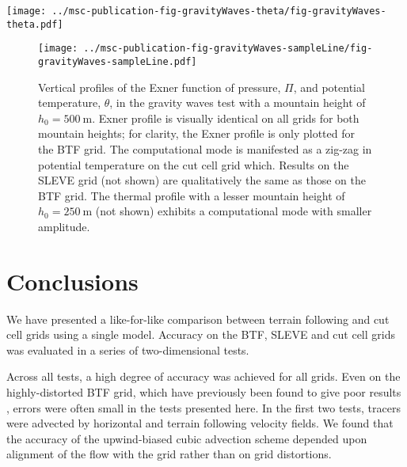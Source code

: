 \documentclass[twocol]{ametsoc}
\begin{document}
\begin{figure*}
	\centering
	\texttt{[image: ../msc-publication-fig-gravityWaves-theta/fig-gravityWaves-theta.pdf]}
%
	\caption{Anomalies in potential temperature in the gravity waves test after 5 hours with a mountain height, \(h_0 = \SI{250}{\meter}\).  The central domain in the lowest \SI{12}{\kilo\meter} is shown on (a) the BTF grid, and (c) the cut cell grid.  The four lowest layers of each grid are shown for (b) BTF, and (d) cut cell grids, using a narrower potential temperature scale.  The results on the SLEVE grid (not shown) are qualitatively identical to results on the BTF grid.}
	\label{fig:gw-theta}
\end{figure*}

\begin{figure}
	\centering
	\texttt{[image: ../msc-publication-fig-gravityWaves-sampleLine/fig-gravityWaves-sampleLine.pdf]}
%
	\caption{Vertical profiles of the Exner function of pressure, \(\Pi\), and potential temperature, \(\theta\), in the gravity waves test with a mountain height of \(h_0 = \SI{500}{\meter}\).  Exner profile is visually identical on all grids for both mountain heights; for clarity, the Exner profile is only plotted for the BTF grid.  The computational mode is manifested as a zig-zag in potential temperature on the cut cell grid which.   Results on the SLEVE grid (not shown) are qualitatively the same as those on the BTF grid.  The thermal profile with a lesser mountain height of \(h_0 = \SI{250}{\meter}\) (not shown) exhibits a computational mode with smaller amplitude.}
	\label{fig:gw-exner-theta}
\end{figure}

\section{Conclusions}
We have presented a like-for-like comparison between terrain following and cut cell grids using a single model.  Accuracy on the BTF, SLEVE and cut cell grids was evaluated in a series of two-dimensional tests.

Across all tests, a high degree of accuracy was achieved for all grids.  Even on the highly-distorted BTF grid, which have previously been found to give poor results \citep{schaer2002,klemp2011,good2014}, errors were often small in the tests presented here.  In the first two tests, tracers were advected by horizontal and terrain following velocity fields.  We found that the accuracy of the upwind-biased cubic advection scheme depended upon alignment of the flow with the grid rather than on grid distortions.
\end{document}
